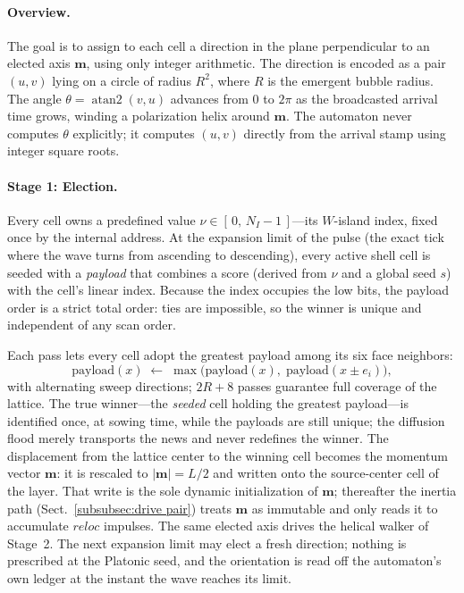 \documentclass[a4paper]{article}
\begin{document}
\paragraph{Overview.}  The goal is to assign to each cell a direction in the plane perpendicular to an elected axis $\boldsymbol{m}$, using only integer arithmetic.  The direction is encoded as a pair $(u,v)$ lying on a circle of radius $R^2$, where $R$ is the emergent bubble radius.  The angle $\theta = \operatorname{atan2}(v,u)$ advances from $0$ to $2\pi$ as the broadcasted arrival time grows, winding a polarization helix around $\boldsymbol{m}$.  The automaton never computes $\theta$ explicitly; it computes $(u,v)$ directly from the arrival stamp using integer square roots.

\paragraph{Stage 1: Election.}  Every cell owns a predefined value $\nu\in[\,0,\,N_{I}-1\,]$---its $W$-island index, fixed once by the internal address.  At the expansion limit of the pulse (the exact tick where the wave turns from ascending to descending), every active shell cell is seeded with a \emph{payload} that combines a score (derived from $\nu$ and a global seed $s$) with the cell's linear index.  Because the index occupies the low bits, the payload order is a strict total order: ties are impossible, so the winner is unique and independent of any scan order.

Each pass lets every cell adopt the greatest payload among its six face neighbors:
\[
\mathrm{payload}(x)\;\leftarrow\;\max\bigl(\mathrm{payload}(x),\;\mathrm{payload}(x\pm e_i)\bigr),
\]
with alternating sweep directions; $2R+8$ passes guarantee full coverage of the lattice.  The true winner---the \emph{seeded} cell holding the greatest payload---is identified once, at sowing time, while the payloads are still unique; the diffusion flood merely transports the news and never redefines the winner.  The displacement from the lattice center to the winning cell becomes the momentum vector $\boldsymbol{m}$: it is rescaled to $\lvert\boldsymbol{m}\rvert=L/2$ and written onto the source-center cell of the layer.  That write is the sole dynamic initialization of $\boldsymbol{m}$; thereafter the inertia path (Sect.~\ref{subsubsec:drive pair}) treats $\boldsymbol{m}$ as immutable and only reads it to accumulate $\mathit{reloc}$ impulses.  The same elected axis drives the helical walker of Stage~2.  The next expansion limit may elect a fresh direction; nothing is prescribed at the Platonic seed, and the orientation is read off the automaton's own ledger at the instant the wave reaches its limit.
\end{document}
